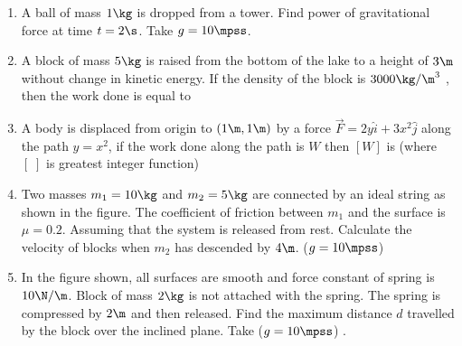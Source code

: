 \documentclass{article}
\begin{document}
\jeeSectionB
\begin{enumerate}\addtocounter{enumi}{20}

\item A ball of mass $1 \kg$ is dropped from a tower. Find power of gravitational force at time $t = 2 \s$. Take $g = 10 \mpss$.

\item A block of mass $5 \kg$ is raised from the bottom of the lake to a height of $3 \m$ without change in kinetic energy. If the density of the block is $3000 \kg/\m^3$ , then the work done is equal to 

\item A body is displaced from origin to $(1\m,1\m)$ by a force $\vec{F}=2y\hat{i} + 3x^2\hat{j}$ along the path $y=x^2$, if the work done along the path is $W$ then $[W]$ is (where $[\; ]$ is greatest integer function) 

\item Two masses $m_1 = 10 \kg$ and $m_2 = 5 \kg$ are connected by an ideal string as shown in the figure. The coefficient of friction between $m_1$ and the surface is $\mu = 0.2$. Assuming that the system is released from rest. Calculate the velocity of blocks when $m_2$ has descended by $4 \m$. ($g = 10 \mpss$) 
\begin{center}
\end{center}

\item In the figure shown, all surfaces are smooth and force constant of spring is $10 \N/\m$. Block of mass $2 \kg$ is not attached with the spring. The spring is compressed by $2\m$ and then released. Find the maximum distance $d$ travelled by the block over the inclined plane. Take ($g = 10 \mpss$) .
\begin{center}
\end{center}




\end{enumerate}
\end{document}
